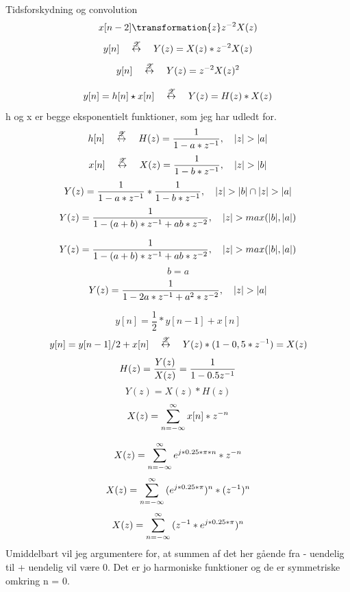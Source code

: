 \begin{Opgaver}
\begin{kapitel}[Z transformation]
\begin{Opgave}
            \begin{UnderOpgave}[\text{y[n] = x[n]*x[n - 2]}]
                Tidsforskydning og convolution
                \[x[n-2] \transformation{z} z^{-2}X(z)\]
                \[y[n] \transformation{Z} Y(z) = X(z)*z^{-2}X(z) \]
                \[y[n] \transformation{Z} Y(z) = z^{-2}X(z)^2 \]
            \end{UnderOpgave}
        \end{Opgave}
        \begin{Opgave}
            \begin{UnderOpgave}[\text{$h[n] = a^nu[n], \tab{0} x[n] = b^nu[n], \tab{0} a\neq b$}]
                \[y[n] = h[n]\star x[n] \transformation{Z} Y(z) = H(z)*X(z)\]
                h og x er begge eksponentielt funktioner, som jeg har udledt for. 
                \[h[n] \transformation{Z} H(z) = \frac{1}{1 -a*z^{-1}}, \tab{0} |z| > |a|\]
                \[x[n] \transformation{Z} X(z) = \frac{1}{1 -b*z^{-1}}, \tab{0} |z| > |b|\]
                \[Y(z) = \frac{1}{1 -a*z^{-1}} * \frac{1}{1 -b*z^{-1}}, \tab{0} |z| > |b| \cap |z| > |a| \]
                \[Y(z) = \frac{1}{1 - (a + b)*z^{-1} + ab*z^{-2}}, \tab{0} |z| > max(|b|, |a|) \]                
            \end{UnderOpgave}
            \begin{UnderOpgave}[\text{$h[n] = a^nu[n],\tab{0} x[n] = b^nu[n],\tab{0} a=b$}]
                \[Y(z) = \frac{1}{1 - (a + b)*z^{-1} + ab*z^{-2}}, \tab{0} |z| > max(|b|, |a|)\]
                \[b = a\]
                \[Y(z) = \frac{1}{1 - 2a*z^{-1} + a^2*z^{-2}}, \tab{0} |z| > |a|\]
                                
            \end{UnderOpgave}
        \end{Opgave}
        \begin{Opgave}
            \[y[n]= \frac{1}{2} * y[n - 1] + x[n]\]
            \[y[n] = y[n-1]/2 + x[n] \transformation{Z} Y(z)*(1 - 0,5*z^{-1}) = X(z)\]
            \[H(z) = \frac{Y(z)}{X(z)} = \filterZ{1}{1, -0.5}\]
            \[Y(z) = X(z)*H(z)\]
            \[X(z) = \sum_{n = -\infty}^{\infty}{x[n]*z^{-n}}\]

            \begin{UnderOpgave}[\text{$x[n] = e^{j*0.25*\pi * n}, \tab{0} -\infty < n < \infty$}]
                \[X(z) = \sum_{n = -\infty}^{\infty}{e^{j*0.25*\pi * n}*z^{-n}}\]
                \[X(z) = \sum_{n = -\infty}^{\infty}{(e^{j*0.25*\pi})^n*(z^{-1})^n}\]
                \[X(z) = \sum_{n = -\infty}^{\infty}{(z^{-1}*e^{j*0.25*\pi})^n}\]
                Umiddelbart vil jeg argumentere for, at summen af det her gående fra - uendelig til + uendelig vil være 0. 
                Det er jo harmoniske funktioner og de er symmetriske omkring n = 0. \\\\


\end{UnderOpgave}
\end{Opgave}
\end{kapitel}
\end{Opgaver}
